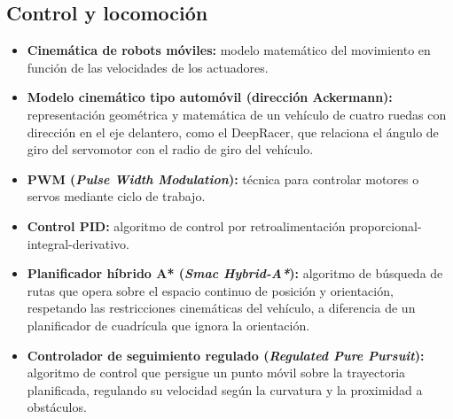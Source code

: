 \documentclass[12pt,letterpaper]{article}
\begin{document}
\subsection{Control y locomoción}
\begin{itemize}[leftmargin=*]
    \item \textbf{Cinemática de robots móviles:} modelo matemático del movimiento en función de las velocidades de los actuadores.
    \item \textbf{Modelo cinemático tipo automóvil (dirección Ackermann):} representación geométrica y matemática de un vehículo de cuatro ruedas con dirección en el eje delantero, como el DeepRacer, que relaciona el ángulo de giro del servomotor con el radio de giro del vehículo.
    \item \textbf{PWM (\textit{Pulse Width Modulation}):} técnica para controlar motores o servos mediante ciclo de trabajo.
    \item \textbf{Control PID:} algoritmo de control por retroalimentación proporcional-integral-derivativo.
    \item \textbf{Planificador híbrido A* (\textit{Smac Hybrid-A*}):} algoritmo de búsqueda de rutas que opera sobre el espacio continuo de posición y orientación, respetando las restricciones cinemáticas del vehículo, a diferencia de un planificador de cuadrícula que ignora la orientación.
    \item \textbf{Controlador de seguimiento regulado (\textit{Regulated Pure Pursuit}):} algoritmo de control que persigue un punto móvil sobre la trayectoria planificada, regulando su velocidad según la curvatura y la proximidad a obstáculos.
\end{itemize}
\end{document}
